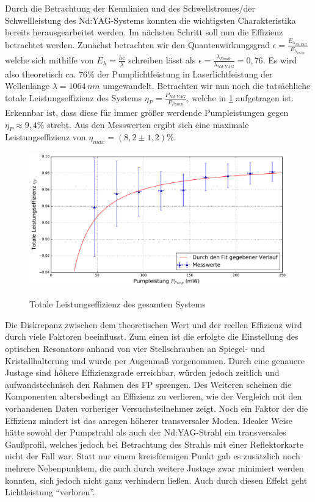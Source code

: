 \documentclass[twoside,colorback,accentcolor=tud4c,11pt]{tudreport}
\begin{document}
Durch die Betrachtung der Kennlinien und des Schwellstromes/der Schwellleistung des Nd:YAG-Systems konnten die wichtigsten Charakteristika bereits herausgearbeitet werden. Im nächsten Schritt soll nun die Effizienz betrachtet werden.
Zunächst betrachten wir den Quantenwirkungsgrad $\epsilon=\frac{E_{\lambda_{Nd:YAG}}}{E_{\lambda_{Diode}}}$ welche sich mithilfe von $E_{\lambda}=\frac{hc}{\lambda}$ schreiben lässt als $\epsilon=\frac{\lambda_{Diode}}{\lambda_{Nd:YAG}}=0,76$. Es wird also theoretisch ca. $76\%$ der Pumplichtleistung in Laserlichtleistung der Wellenlänge $\lambda=1064\,\si{nm}$ umgewandelt. Betrachten wir nun noch die tatsächliche totale Leistungseffizienz des Systems $\eta_{P}=\frac{P_{Nd:YAG}}{P_{Pump}}$, welche in \ref{toleist} aufgetragen ist. Erkennbar ist, dass diese für immer größer werdende Pumpleistungen gegen $\eta_{P}\approx 9,4\%$ strebt.
Aus den Messwerten ergibt sich eine maximale Leistungseffizienz von $\eta_{max}=(8,2\pm 1,2)\%$.
\begin{figure}[H]
\centering
   	\begin{minipage}[b]{0.85\textwidth}
   	\includegraphics[width=\textwidth]{graphics/tot_leisteff.pdf}
  	\label{toleist}
   	\end{minipage}
\caption{Totale Leistungseffizienz des gesamten Systems}	
\end{figure}
Die Diskrepanz zwischen dem theoretischen Wert und der reellen Effizienz wird durch viele Faktoren beeinflusst. Zum einen ist die erfolgte die Einstellung des optischen Resonators anhand von vier Stellschrauben an Spiegel- und Kristallhalterung und wurde per Augenmaß vorgenommen. Durch eine genauere Justage sind höhere Effizienzgrade erreichbar, würden jedoch zeitlich und aufwandstechnisch den Rahmen des FP sprengen. Des Weiteren scheinen die Komponenten altersbedingt an Effizienz zu verlieren, wie der Vergleich mit den vorhandenen Daten vorheriger Versuchsteilnehmer zeigt. Noch ein Faktor der die Effizienz mindert ist das anregen höherer transversaler Moden. Idealer Weise hätte sowohl der Pumpstrahl als auch der Nd:YAG-Strahl ein transversales Gaußprofil, welches jedoch bei Betrachtung des Strahls mit einer Reflektorkarte nicht der Fall war. Statt nur einem kreisförmigen Punkt gab es zusätzlich noch mehrere Nebenpunktem, die auch durch weitere Justage zwar minimiert werden konnten, sich jedoch nicht ganz verhindern ließen. Auch durch diesen Effekt geht Lichtleistung "`verloren"'.
\pagebreak
\end{document}
